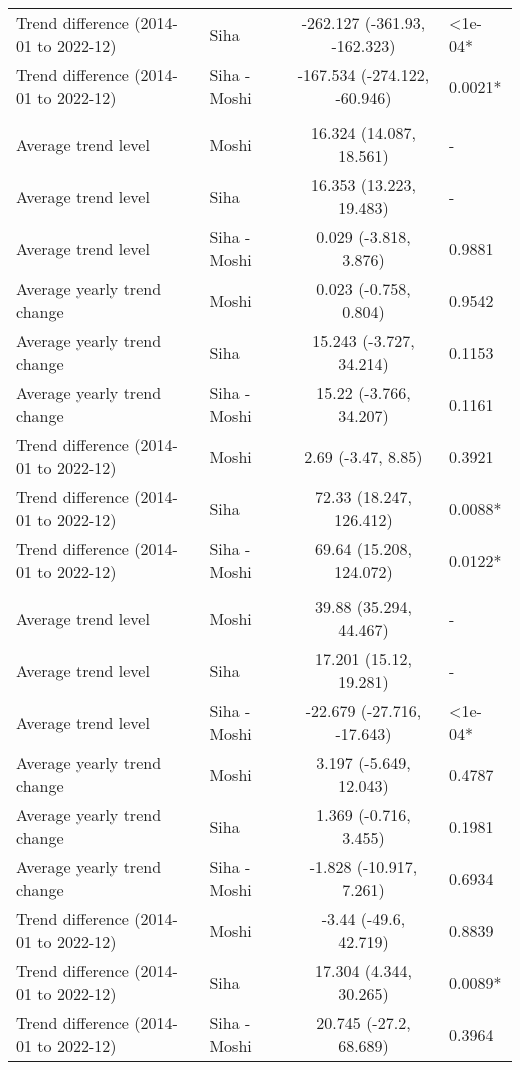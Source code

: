 \begin{longtable}{l|lcl}
Trend difference (2014-01 to 2022-12) & Siha & -262.127 (-361.93, -162.323) & <1e-04* \\ 
Trend difference (2014-01 to 2022-12) & Siha - Moshi & -167.534 (-274.122, -60.946) & 0.0021* \\ 
\midrule\addlinespace[2.5pt]
\multicolumn{4}{l}{Neoplasms/Cancer} \\[2.5pt] 
\midrule\addlinespace[2.5pt]
Average trend level & Moshi & 16.324 (14.087, 18.561) & - \\ 
Average trend level & Siha & 16.353 (13.223, 19.483) & - \\ 
Average trend level & Siha - Moshi & 0.029 (-3.818, 3.876) & 0.9881 \\ 
Average yearly trend change & Moshi & 0.023 (-0.758, 0.804) & 0.9542 \\ 
Average yearly trend change & Siha & 15.243 (-3.727, 34.214) & 0.1153 \\ 
Average yearly trend change & Siha - Moshi & 15.22 (-3.766, 34.207) & 0.1161 \\ 
Trend difference (2014-01 to 2022-12) & Moshi & 2.69 (-3.47, 8.85) & 0.3921 \\ 
Trend difference (2014-01 to 2022-12) & Siha & 72.33 (18.247, 126.412) & 0.0088* \\ 
Trend difference (2014-01 to 2022-12) & Siha - Moshi & 69.64 (15.208, 124.072) & 0.0122* \\ 
\midrule\addlinespace[2.5pt]
\multicolumn{4}{l}{Neuroses} \\[2.5pt] 
\midrule\addlinespace[2.5pt]
Average trend level & Moshi & 39.88 (35.294, 44.467) & - \\ 
Average trend level & Siha & 17.201 (15.12, 19.281) & - \\ 
Average trend level & Siha - Moshi & -22.679 (-27.716, -17.643) & <1e-04* \\ 
Average yearly trend change & Moshi & 3.197 (-5.649, 12.043) & 0.4787 \\ 
Average yearly trend change & Siha & 1.369 (-0.716, 3.455) & 0.1981 \\ 
Average yearly trend change & Siha - Moshi & -1.828 (-10.917, 7.261) & 0.6934 \\ 
Trend difference (2014-01 to 2022-12) & Moshi & -3.44 (-49.6, 42.719) & 0.8839 \\ 
Trend difference (2014-01 to 2022-12) & Siha & 17.304 (4.344, 30.265) & 0.0089* \\ 
Trend difference (2014-01 to 2022-12) & Siha - Moshi & 20.745 (-27.2, 68.689) & 0.3964 \\ 

\end{longtable}
